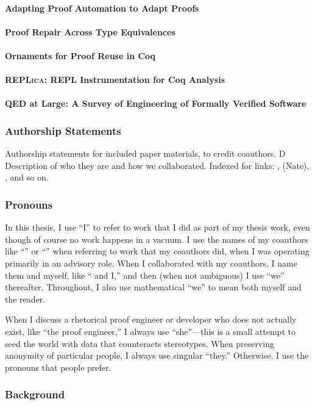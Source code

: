 \paragraph{Adapting Proof Automation to Adapt Proofs}

\paragraph{Proof Repair Across Type Equivalences}

\paragraph{Ornaments for Proof Reuse in Coq}

\paragraph{\textsc{REPLica}: REPL Instrumentation for Coq Analysis}

\paragraph{QED at Large: A Survey of Engineering of Formally Verified Software}

\subsubsection*{Authorship Statements}

Authorship statements for included paper materials, to credit coauthors. D
Description of who they are and how we collaborated.
Indexed for links: ,  (Nate),
, and so on.

\subsubsection*{Pronouns}

In this thesis, I use ``I'' to refer to work that I did as part of my thesis work,
even though of course no work happens in a vacuum.
I use the names of my coauthors like ``'' or ``'' when referring to work that my coauthors did,
when I was operating primarily in an advisory role.
When I collaborated with my coauthors, I name them and myself, like `` and I,''
and then (when not ambiguous) I use ``we'' thereafter.
Throughout, I also use mathematical ``we'' to mean both myself and the reader.

When I discuss a rhetorical proof engineer or developer who does not actually exist,
like ``the proof engineer,'' I always use ``she''---this is a small attempt
to seed the world with data that counteracts stereotypes. 
When preserving anonymity of particular people, I always use singular ``they.''
Otherwise, I use the pronouns that people prefer.

\subsubsection*{Background}



